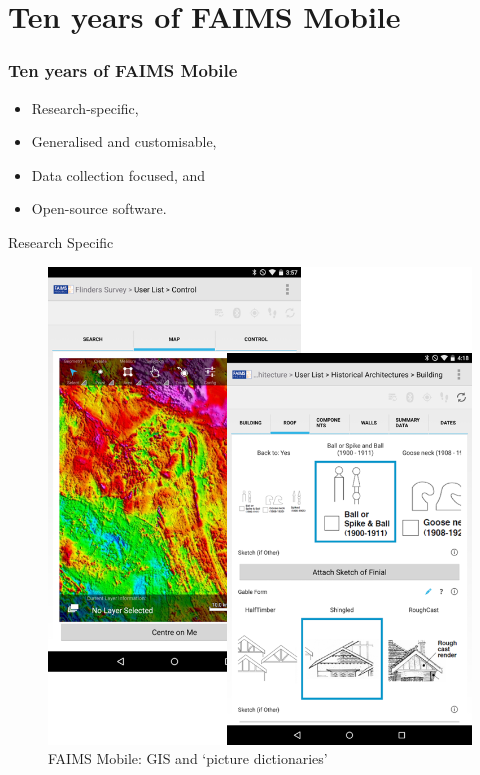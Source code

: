 
\section{Ten years of FAIMS Mobile}

\begin{sectionframe} %
	\frametitle{Ten years of FAIMS Mobile}

\begin{itemize}
    \item Research-specific,
    \item Generalised and customisable,
    \item Data collection focused, and
    \item Open-source software.
\end{itemize}


\end{sectionframe}



\begin{frame}{Research Specific}
 \begin{figure}[H]
    \centering
    \vspace{-0.5cm}
        \includegraphics[height=.75\textheight]{figures/FAIMS-screenshots.png}
        \caption{FAIMS Mobile: GIS and `picture dictionaries'}
        \label{fig:FAIMS-mobile-screenshots}
 \end{figure}
\end{frame}

